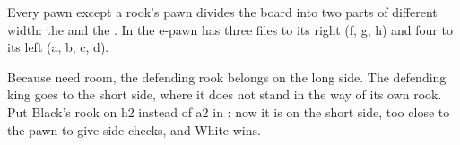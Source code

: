 
Every pawn except a rook's pawn divides the board into two parts of different width: the
 and the
.
In  the e-pawn has three files to its right (f, g, h) and four to its
left (a, b, c, d).

Because  need room, the defending rook belongs on the long
side. The defending king goes to the short side, where it does not stand in the way of its own
rook. Put Black's rook on h2 instead of a2 in : now it is on the short
side, too close to the pawn to give side checks, and White wins.
